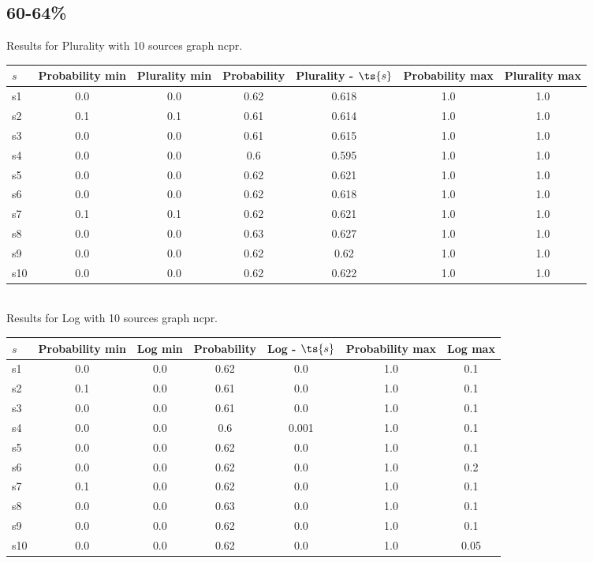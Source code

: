 \documentclass{article}
\begin{document}
\newpage

\subsection{60-64\%}

\noindent Results for Plurality with 10 sources graph ncpr.

\noindent\begin{tabular}{|l|c|c|c|c|c|c|}
\hline
$s$& Probability min & Plurality min & Probability & Plurality - $\ts{s}$ & Probability max & Plurality max\\
\hline
s1 &0.0 & 0.0 & 0.62 & 0.618 & 1.0 & 1.0\\
\hline
s2 &0.1 & 0.1 & 0.61 & 0.614 & 1.0 & 1.0\\
\hline
s3 &0.0 & 0.0 & 0.61 & 0.615 & 1.0 & 1.0\\
\hline
s4 &0.0 & 0.0 & 0.6 & 0.595 & 1.0 & 1.0\\
\hline
s5 &0.0 & 0.0 & 0.62 & 0.621 & 1.0 & 1.0\\
\hline
s6 &0.0 & 0.0 & 0.62 & 0.618 & 1.0 & 1.0\\
\hline
s7 &0.1 & 0.1 & 0.62 & 0.621 & 1.0 & 1.0\\
\hline
s8 &0.0 & 0.0 & 0.63 & 0.627 & 1.0 & 1.0\\
\hline
s9 &0.0 & 0.0 & 0.62 & 0.62 & 1.0 & 1.0\\
\hline
s10 &0.0 & 0.0 & 0.62 & 0.622 & 1.0 & 1.0\\
\hline
\end{tabular}\\

\noindent Results for Log with 10 sources graph ncpr.

\noindent\begin{tabular}{|l|c|c|c|c|c|c|}
\hline
$s$& Probability min & Log min & Probability & Log - $\ts{s}$ & Probability max & Log max\\
\hline
s1 &0.0 & 0.0 & 0.62 & 0.0 & 1.0 & 0.1\\
\hline
s2 &0.1 & 0.0 & 0.61 & 0.0 & 1.0 & 0.1\\
\hline
s3 &0.0 & 0.0 & 0.61 & 0.0 & 1.0 & 0.1\\
\hline
s4 &0.0 & 0.0 & 0.6 & 0.001 & 1.0 & 0.1\\
\hline
s5 &0.0 & 0.0 & 0.62 & 0.0 & 1.0 & 0.1\\
\hline
s6 &0.0 & 0.0 & 0.62 & 0.0 & 1.0 & 0.2\\
\hline
s7 &0.1 & 0.0 & 0.62 & 0.0 & 1.0 & 0.1\\
\hline
s8 &0.0 & 0.0 & 0.63 & 0.0 & 1.0 & 0.1\\
\hline
s9 &0.0 & 0.0 & 0.62 & 0.0 & 1.0 & 0.1\\
\hline
s10 &0.0 & 0.0 & 0.62 & 0.0 & 1.0 & 0.05\\
\hline
\end{tabular}\\
\end{document}
